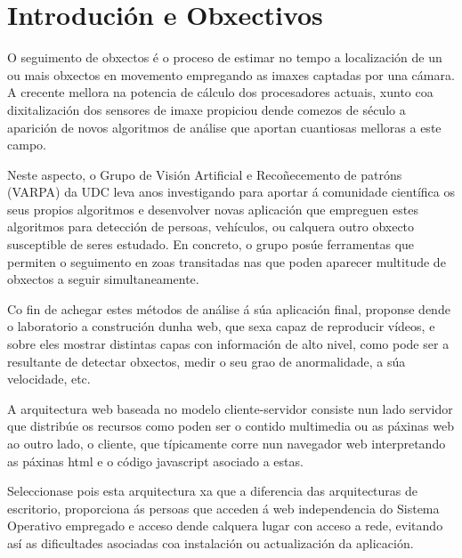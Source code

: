 \chapter{Introdución e Obxectivos}

O seguimento de obxectos é o proceso de estimar no tempo a localización de un ou mais 
obxectos en movemento empregando as imaxes captadas por una cámara. A crecente mellora 
na potencia de cálculo dos procesadores actuais, xunto coa dixitalización dos sensores 
de imaxe propiciou dende comezos de século a aparición de novos algoritmos de análise 
que aportan cuantiosas melloras a este campo.

Neste aspecto, o Grupo de Visión Artificial e Recoñecemento de patróns (VARPA)
da UDC leva anos investigando para aportar á comunidade científica os seus propios algoritmos
e desenvolver novas aplicación que empreguen estes algoritmos para detección de persoas,
vehículos, ou calquera outro obxecto susceptible de seres estudado. En concreto, o
grupo posúe ferramentas que permiten o seguimento en zoas transitadas nas que poden 
aparecer multitude de obxectos a seguir simultaneamente. 

Co fin de achegar estes métodos de análise á súa aplicación final, proponse dende o 
laboratorio a construción dunha web, que sexa capaz de reproducir vídeos, e sobre eles
mostrar distintas capas con información de alto nivel, como pode ser a resultante de
detectar obxectos, medir o seu grao de anormalidade, a súa velocidade, etc. 

A arquitectura web baseada no modelo cliente-servidor consiste nun lado servidor que 
distribúe os recursos como poden ser o contido multimedia ou as páxinas web ao outro
lado, o cliente, que típicamente corre nun navegador web interpretando as páxinas html
e o código javascript asociado a estas. 

Seleccionase pois esta arquitectura xa que a diferencia das arquitecturas de escritorio,
proporciona ás persoas que acceden á web independencia do Sistema Operativo empregado e
acceso dende calquera lugar con acceso a rede, evitando así as dificultades asociadas coa 
instalación ou actualización da aplicación. 

